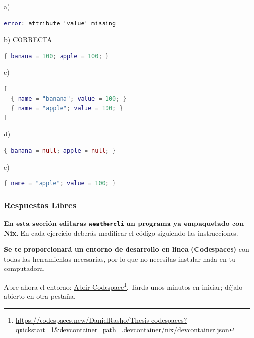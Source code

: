 \begin{opcion}{a)}
\begin{lstlisting}[language=nix]
error: attribute 'value' missing
\end{lstlisting}
\end{opcion}

\begin{opcion}{b)}
CORRECTA
\begin{lstlisting}[language=nix]
{ banana = 100; apple = 100; }
\end{lstlisting}
\end{opcion}

\begin{opcion}{c)}
\begin{lstlisting}[language=nix]
[
  { name = "banana"; value = 100; }
  { name = "apple"; value = 100; }
]
\end{lstlisting}
\end{opcion}

\begin{opcion}{d)}
\begin{lstlisting}[language=nix]
{ banana = null; apple = null; }
\end{lstlisting}
\end{opcion}

\begin{opcion}{e)}
\begin{lstlisting}[language=nix]
{ name = "apple"; value = 100; }
\end{lstlisting}
\end{opcion}

\subsubsection{Respuestas Libres}

\textbf{En esta sección editaras \texttt{weathercli} un programa ya empaquetado con Nix}. En cada ejercicio deberás modificar el código siguiendo las instrucciones.

\textbf{Se te proporcionará un entorno de desarrollo en línea (Codespaces)} con todas las herramientas necesarias, por lo que no necesitas instalar nada en tu computadora.

Abre ahora el entorno: \href{https://codespaces.new/DanielRasho/Thesis-codespaces?quickstart=1&devcontainer_path=.devcontainer/nix/devcontainer.json}{\underline{Abrir Codespace}}\footnote{\url{https://codespaces.new/DanielRasho/Thesis-codespaces?quickstart=1&devcontainer_path=.devcontainer/nix/devcontainer.json}}. Tarda unos minutos en iniciar; déjalo abierto en otra pestaña.

